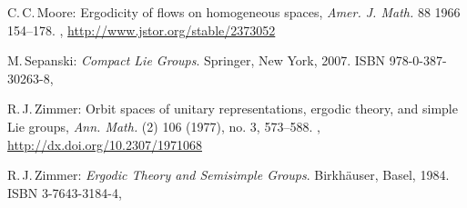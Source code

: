\begin{references}{99}
C.\,C.\,Moore:
Ergodicity of flows on homogeneous spaces,
\emph{Amer. J. Math.} 88 1966 154--178.
,
\maynewline
\url{http://www.jstor.org/stable/2373052}
 
M.\,Sepanski:
\emph{Compact Lie Groups}. 
Springer, New York, 2007.
ISBN 978-0-387-30263-8,
 
 R.\,J.\,Zimmer:
 Orbit spaces of unitary representations, ergodic theory, and simple Lie groups,
 \emph{Ann. Math.} (2) 106 (1977), no. 3, 573--588.
 ,
 \maynewline
 \url{http://dx.doi.org/10.2307/1971068}

R.\,J.\,Zimmer:
\emph{Ergodic Theory and Semisimple Groups}.
Birkh\"auser, Basel, 1984.
ISBN 3-7643-3184-4,

 \end{references}



